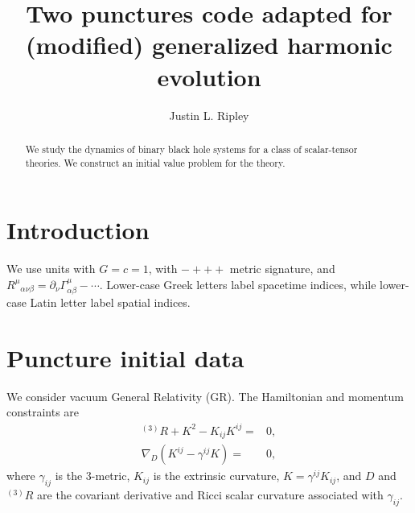 \documentclass[%
notitlepage,
report,
nofootinbib,
 amsmath,amssymb,
 aps,
]{revtex4-1}
\newcommand{\ssec}[1]{\section{#1}}
\begin{document}
\title{Two punctures code adapted for (modified) generalized harmonic evolution}
\author{Justin L. Ripley}
%
\begin{abstract}
We study the dynamics of binary black hole systems for a class of
scalar-tensor theories.
We construct an initial value problem for the theory.
\end{abstract}
\maketitle
\ssec{Introduction}%
We use units with $G=c=1$, with $-+++$ metric signature, and
$R^{\mu}{}_{\alpha\nu\beta}=\partial_{\nu}\Gamma^{\mu}_{\alpha\beta}-\cdots$.
Lower-case Greek letters label spacetime indices, while lower-case
Latin letter label spatial indices.
\ssec{Puncture initial data}%
We consider vacuum General Relativity (GR). The Hamiltonian and
momentum constraints are
\begin{subequations}
\begin{align}
   {}^{(3)}R+K^2-K_{ij}K^{ij} 
   =&
   0
   ,\\
   \nabla_D\left(K^{ij}-\gamma^{ij}K\right)
   =&
   0
   ,
\end{align}
\end{subequations}
where $\gamma_{ij}$ is the 3-metric, $K_{ij}$ is the extrinsic curvature,
$K=\gamma^{ij}K_{ij}$, and $D$ and ${}^{(3)}R$ are the covariant derivative
and Ricci scalar curvature associated with $\gamma_{ij}$.
\end{document}
